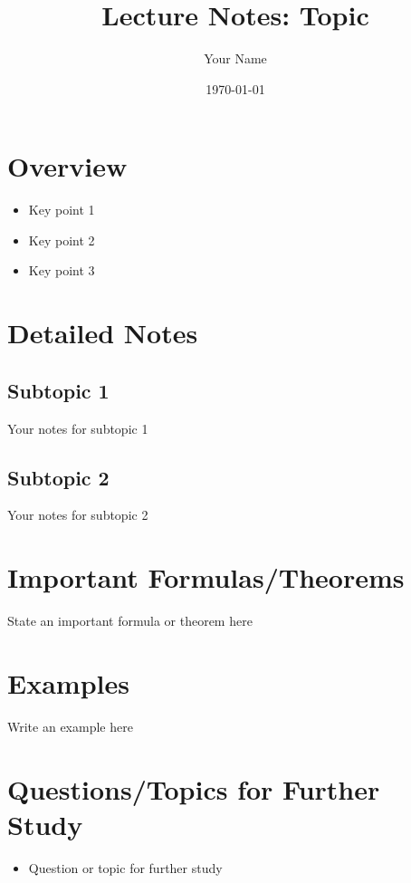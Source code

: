 \documentclass[12pt,a4paper]{article}
\title{Lecture Notes: Topic}
\author{Your Name}
\date{\today}
\begin{document}
\maketitle

\section{Overview}
\begin{tcolorbox}[colback=yellow!10!white,colframe=yellow!50!black,title=Key Points]
  \begin{itemize}
    \item Key point 1
    \item Key point 2
    \item Key point 3
  \end{itemize}
\end{tcolorbox}

\section{Detailed Notes}
\subsection{Subtopic 1}
Your notes for subtopic 1

\subsection{Subtopic 2}
Your notes for subtopic 2

\section{Important Formulas/Theorems}
\begin{tcolorbox}[colback=blue!5!white,colframe=blue!75!black,title=Key Formula/Theorem]
  State an important formula or theorem here
\end{tcolorbox}

\section{Examples}
\begin{tcolorbox}
  Write an example here
\end{tcolorbox}

\section{Questions/Topics for Further Study}
\begin{itemize}
  \item Question or topic for further study
\end{itemize}
\end{document}
